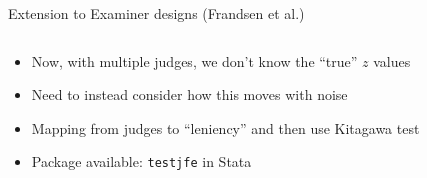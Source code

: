 \documentclass[notes,11pt, aspectratio=169]{beamer}
\begin{document}
\begin{frame}{Extension to Examiner designs (Frandsen et al.)}
  \begin{columns}[onlytextwidth, T] %
    \begin{column}{.5\textwidth}
      \begin{itemize}
      \item Now, with multiple judges, we don't know the ``true'' $z$ values
      \item Need to instead consider how this moves with noise
      \item Mapping from judges to ``leniency'' and then use Kitagawa test
        \item Package available: \texttt{testjfe} in Stata
      \end{itemize}
    \end{column}%
    \hfill%
    \begin{column}{.5\textwidth}
    \end{column}%
  \end{columns}
\end{frame}
\end{document}
